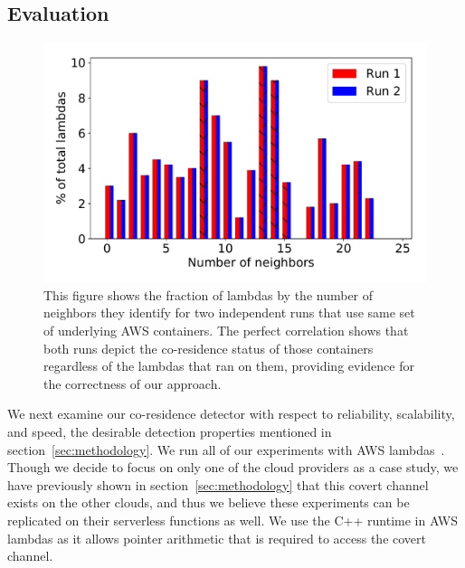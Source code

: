 \subsection{Evaluation}
\label{sec:eval}

\begin{figure}[!t]
  \includegraphics[width=.99\linewidth]{fig/correlation.pdf}
  \caption{This figure shows the fraction of lambdas by the number of neighbors 
  they identify for two independent runs that use same set of underlying AWS
  containers. The perfect correlation shows that both runs depict the co-residence 
  status of those containers regardless of the lambdas that ran on them, providing
  evidence for the correctness of our approach.
\label{fig:correlation}}
\end{figure}


We next examine our co-residence detector with respect to reliability,
scalability, and speed, the desirable detection properties mentioned in
section~\ref{sec:methodology}.  We run all of our experiments with AWS
lambdas~\cite{awscloud}. Though we decide to focus on only one of the cloud
providers as a case study, we have previously shown in
section~\ref{sec:methodology} that this covert channel exists on the other
clouds, and thus we believe these experiments can be replicated on their serverless
functions as well. We use the C++ runtime in AWS lambdas as it allows pointer
arithmetic that is required to access the covert channel.


